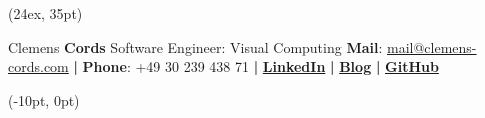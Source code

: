\documentclass[11pt]{article}
\begin{document}

\begin{textblock*}{\paperwidth}(24ex, 35pt)
\begin{flushleft}
{\fontsize{30}{35}\selectfont \!Clemens \textbf{Cords}} \newline
{\color{my_pink} {Software Engineer: Visual Computing}} \newline
\newline
\textbf{Mail}: \href{mailto:mail@clemens-cords.com}{mail@clemens-cords.com} \textbf{|} \textbf{Phone}: +49 30 239 438 71 \textbf{|} \href{https://www.linkedin.com/in/clemens-cords/}{\textbf{LinkedIn}} \textbf{|} \href{http://clemens-cords.com/}{\textbf{Blog}} \textbf{|} \href{https://github.com/Clemapfel}{\textbf{GitHub}}
\end{flushleft}
\end{textblock*}

\begin{textblock*}{\paperwidth}(-10pt, 0pt)
\end{textblock*}
\end{document}
